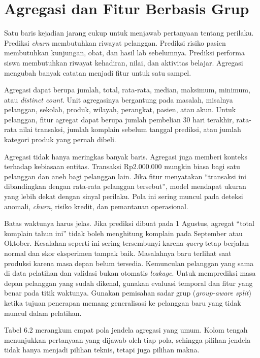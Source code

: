 \section{Agregasi dan Fitur Berbasis Grup}\label{agregasi-dan-fitur-berbasis-grup}

Satu baris kejadian jarang cukup untuk menjawab pertanyaan tentang perilaku. Prediksi \emph{churn} membutuhkan riwayat pelanggan. Prediksi risiko pasien membutuhkan kunjungan, obat, dan hasil lab sebelumnya. Prediksi performa siswa membutuhkan riwayat kehadiran, nilai, dan aktivitas belajar. Agregasi mengubah banyak catatan menjadi fitur untuk satu sampel.

Agregasi dapat berupa jumlah, total, rata-rata, median, maksimum, minimum, atau \emph{distinct count}. Unit agregasinya bergantung pada masalah, misalnya pelanggan, sekolah, produk, wilayah, perangkat, pasien, atau akun. Untuk pelanggan, fitur agregat dapat berupa jumlah pembelian 30 hari terakhir, rata-rata nilai transaksi, jumlah komplain sebelum tanggal prediksi, atau jumlah kategori produk yang pernah dibeli.

Agregasi tidak hanya meringkas banyak baris. Agregasi juga memberi konteks terhadap kebiasaan entitas. Transaksi Rp2.000.000 mungkin biasa bagi satu pelanggan dan aneh bagi pelanggan lain. Jika fitur menyatakan ``transaksi ini dibandingkan dengan rata-rata pelanggan tersebut'', model mendapat ukuran yang lebih dekat dengan sinyal perilaku. Pola ini sering muncul pada deteksi anomali, \emph{churn}, risiko kredit, dan pemantauan operasional.

Batas waktunya harus jelas. Jika prediksi dibuat pada 1 Agustus, agregat ``total komplain tahun ini'' tidak boleh menghitung komplain pada September atau Oktober. Kesalahan seperti ini sering tersembunyi karena \emph{query} tetap berjalan normal dan skor eksperimen tampak baik. Masalahnya baru terlihat saat produksi karena masa depan belum tersedia. Kemunculan pelanggan yang sama di data pelatihan dan validasi bukan otomatis \emph{leakage}. Untuk memprediksi masa depan pelanggan yang sudah dikenal, gunakan evaluasi temporal dan fitur yang benar pada titik waktunya. Gunakan pemisahan sadar grup (\emph{group-aware split}) ketika tujuan penerapan memang generalisasi ke pelanggan baru yang tidak muncul dalam pelatihan.

Tabel 6.2 merangkum empat pola jendela agregasi yang umum. Kolom tengah menunjukkan pertanyaan yang dijawab oleh tiap pola, sehingga pilihan jendela tidak hanya menjadi pilihan teknis, tetapi juga pilihan makna.

